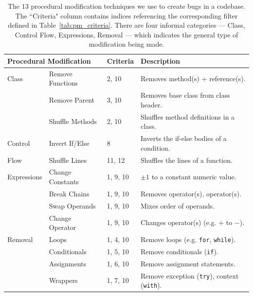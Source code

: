 \begin{table}[h]
    \centering
    \begin{tabular}{ll|ll}
\toprule
\multicolumn{2}{l|}{Procedural Modification} & Criteria & Description \\
\midrule
Class & Remove Functions & 2, 10 & Removes method(s) + reference(s). \\
      & Remove Parent & 3, 10 & Removes base class from class header. \\
      & Shuffle Methods & 2, 10 & Shuffles method definitions in a class. \\
\midrule
Control & Invert If/Else & 8 & Inverts the if-else bodies of a condition. \\
Flow    & Shuffle Lines & 11, 12 & Shuffles the lines of a function. \\
\midrule
Expressions & Change Constants & 1, 9, 10 & $\pm1$ to a constant numeric value.\\
            & Break Chains     & 1, 9, 10 & Removes operator(s), operator(s). \\
            & Swap Operands    & 1, 9, 10 & Mixes order of operands. \\
            & Change Operator  & 1, 9, 10 & Changes operator(s) (e.g. $+$ to $-$). \\
\midrule
Removal & Loops & 1, 4, 10        & Remove loops (e.g. \texttt{for}, \texttt{while}). \\
        & Conditionals & 1, 5, 10 & Remove conditionals (\texttt{if}). \\
        & Assignments & 1, 6, 10  & Remove assignment statements. \\
        & Wrappers & 1, 7, 10     & Remove exception (\texttt{try}), context (\texttt{with}). \\ 
\bottomrule
    \end{tabular}
    \caption{
    The $13$ procedural modification techniques we use to create bugs in a codebase.
    The ``Criteria" column contains indices referencing the corresponding filter defined in Table~\ref{tab:pm_criteria}.
    There are four informal categories --- Class, Control Flow, Expressions, Removal --- which indicates the general type of modification being made.
    }
    \label{tab:pm_list}
\end{table}
